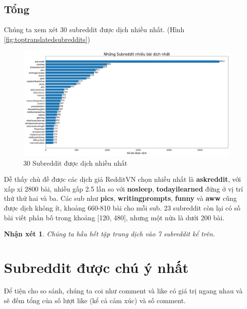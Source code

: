 \documentclass[10pt,a4paper]{article}
\newtheorem{remark}{Nhận xét}
\begin{document}
\subsection{Tổng}
Chúng ta xem xét 30 subreddit được dịch nhiều nhất. (Hình \eqref{fig:toptranslatedsubreddits})
\begin{figure}[!h]
    \centering
    \includegraphics[width=\textwidth]{img/TopTranslatedSubreddits.png}
    \caption{30 Subreddit được dịch nhiều nhất}
    \label{fig:toptranslatedsubreddits}
\end{figure}

Dễ thấy chủ đề được các dịch giả RedditVN chọn nhiều nhất là \textbf{askreddit}, với xấp xỉ 2800 bài, nhiều gấp 2.5 lần so với \textbf{nosleep}, \textbf{todayilearned} đứng ở vị trí thứ thứ hai và ba. Các sub như \textbf{pics}, \textbf{writingprompts}, \textbf{funny} và \textbf{aww} cũng được dịch không ít, khoảng 660-810 bài cho mỗi sub. 23 subreddit còn lại có số bài viết phân bố trong khoảng [120, 480], nhưng một nửa là dưới 200 bài.

\begin{remark}
    \label{re:top6subreddits}
    Chúng ta hầu hết tập trung dịch vào 7 subreddit kể trên.
\end{remark}

\section{Subreddit được chú ý nhất}
\label{sec:interest}

Để tiện cho so sánh, chúng ta coi như comment và like có giá trị ngang nhau và sẽ đếm tổng của số lượt like (kể cả cảm xúc) và số comment.
\end{document}
